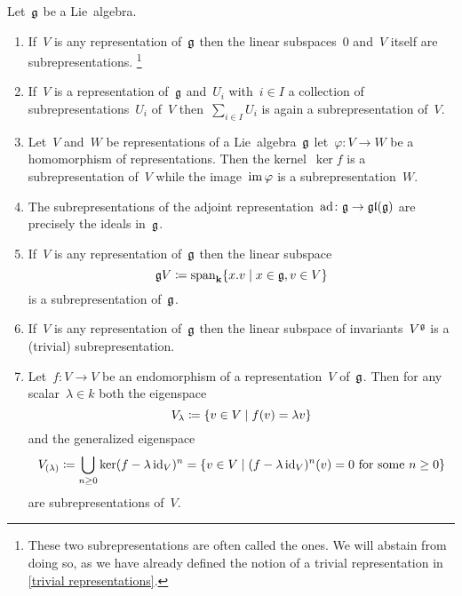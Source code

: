 \begin{examples}
  Let~$\mathfrak{g}$ be a Lie~algebra.
  \begin{enumerate}
    \item
      If~$V$ is any representation of~$\mathfrak{g}$ then the linear subspaces~$0$ and~$V$ itself are subrepresentations.%
    \footnote{These two subrepresentations are often called the  ones.
      We will abstain from doing so, as we have already defined the notion of a trivial representation in \cref{trivial representations}.}
    \item
      If~$V$ is a representation of~$\mathfrak{g}$ and~$U_i$ with~$i \in I$ a collection of subrepresentations~$U_i$ of~$V$ then~$\sum_{i \in I} U_i$ is again a subrepresentation of~$V$.
    \item
      Let~$V$ and~$W$ be representations of a Lie~algebra~$\mathfrak{g}$ let~$\varphi \colon V \to W$ be a homomorphism of representations.
      Then the kernel~$\ker f$ is a subrepresentation of~$V$ while the image~$\operatorname{im} \varphi$ is a subrepresentation~$W$.
    \item
      The subrepresentations of the adjoint representation~$\operatorname{ad} \colon \mathfrak{g} \to \mathfrak{gl}(\mathfrak{g})$ are precisely the ideals in~$\mathfrak{g}$.
    \item
      If~$V$ is any representation of~$\mathfrak{g}$ then the linear subspace
      \[
        \glie V
        \defined
        \vspan_\kf
        \{
          x.v
          \suchthat
          x \in \glie,
          v \in V
        \}
      \]
      is a subrepresentation of~$\mathfrak{g}$.
    \item
      If~$V$ is any representation of~$\mathfrak{g}$ then the linear subspace of invariants~$V^{\mathfrak{g}}$ is a (trivial) subrepresentation.
    \item
      Let~$f \colon V \to V$ be an endomorphism of a representation~$V$ of~$\mathfrak{g}$.
      Then for any scalar~$\lambda \in k$ both the eigenspace
      \[
        V_\lambda
        \defined
        \{
          v \in V
        \suchthat
          f(v)
          =
          \lambda v
        \}
      \]
      and the generalized eigenspace
      \[
        V_{(\lambda)}
        \defined
        \bigcup_{n \geq 0} \ker(f - \lambda \id_V)^n
        =
        \{
          v \in V
        \suchthat
        \text{$(f - \lambda \id_V)^n(v) = 0$ for some~$n \geq 0$}
        \}
      \]
      are subrepresentations of~$V$.
  \end{enumerate}
\end{examples}


